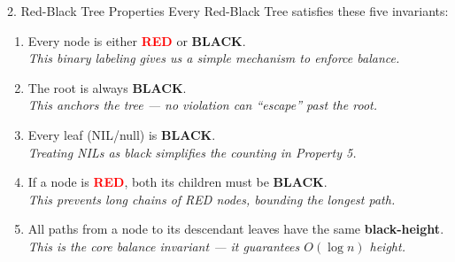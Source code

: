 \documentclass{beamer}
\begin{document}
\begin{frame}{2. Red-Black Tree Properties}
Every Red-Black Tree satisfies these five invariants:
\begin{enumerate}
    \item Every node is either \textcolor{red}{\textbf{RED}} or \textbf{BLACK}.\\
          {\small\textit{This binary labeling gives us a simple mechanism to enforce balance.}}
    \item The root is always \textbf{BLACK}.\\
          {\small\textit{This anchors the tree --- no violation can ``escape'' past the root.}}
    \item Every leaf (NIL/null) is \textbf{BLACK}.\\
          {\small\textit{Treating NILs as black simplifies the counting in Property 5.}}
    \item If a node is \textcolor{red}{\textbf{RED}}, both its children must be \textbf{BLACK}.\\
          {\small\textit{This prevents long chains of RED nodes, bounding the longest path.}}
    \item All paths from a node to its descendant leaves have the same \textbf{black-height}.\\
          {\small\textit{This is the core balance invariant --- it guarantees $O(\log n)$ height.}}
\end{enumerate}
\end{frame}
\end{document}
